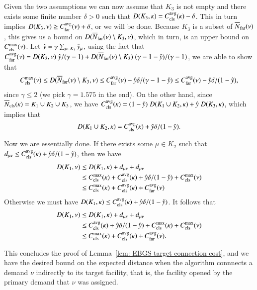 \documentclass[preprint,12pt]{elsarticle}
\begin{document}
  Given the two assumptions we can now assume that $K_3$ is not empty
  and there exists some finite number $\delta > 0$ such that $D(K_3,
  \kappa) = \clsdist(\kappa) - \delta$. This in turn implies $D(K_3,
  \nu) \geq \fardist(\nu) + \delta$, or we will be done. Because $K_3$
  is a subset of $\wbarfarnb(\nu)$, this gives us a bound on
  $D(\wbarfarnb(\nu) \setminus K_3, \nu)$, which in turn, is an upper
  bound on $\clsmax(\nu)$. Let $\hat{y} = \gamma \sum_{\mu\in K_3}
  \bary_{\mu}$, using the fact that $\fardist(\nu) = D(K_3,\nu)\;
  \hat{y}/(\gamma-1) + D(\wbarfarnb(\nu)\setminus K_3)\;
  (\gamma-1-\hat{y})/(\gamma-1)$, we are able to show that
  \begin{equation*}
    \clsmax(\nu) \leq D(\wbarfarnb(\nu) \setminus K_3, \nu) \leq \fardist(\nu) -
    \hat{y}\delta/(\gamma-1-\hat{y}) \leq \fardist(\nu) -
    \hat{y}\delta/(1-\hat{y}),
  \end{equation*}
  since $\gamma \leq 2$ (we pick $\gamma=1.575$ in the end). On the
  other hand, since $\wbarclsnb(\kappa) = K_1 \cup K_2 \cup K_3$, we
  have $\clsdist(\kappa) = (1-\hat{y})\; D(K_1\cup K_2, \kappa) +
  \hat{y}\; D(K_3, \kappa)$, which implies that
  \begin{equation*}
    D(K_1 \cup K_2, \kappa) = \clsdist(\kappa) + \hat{y}\delta/(1-\hat{y}).
  \end{equation*}

  Now we are essentially done. If there exists some $\mu \in K_2$ such
  that $d_{\mu\kappa} \leq \clsdist(\kappa) +
  \hat{y}\delta/(1-\hat{y})$, then we have
  \begin{align*}
    D(K_1, \nu) &\leq D(K_1, \kappa) + d_{\mu\kappa} + d_{\mu\nu} \\
    &\leq \clsmax(\kappa) + \clsdist(\kappa) +
    \hat{y}\delta/(1-\hat{y})
    + \clsmax(\nu)\\
    &\leq \clsmax(\kappa) + \clsdist(\kappa) + \fardist(\nu)
  \end{align*}
  Otherwise we must have $D(K_1, \kappa) \leq \clsdist(\kappa) +
  \hat{y}\delta/(1-\hat{y})$. It follows that
  \begin{align*}
    D(K_1, \nu) &\leq D(K_1, \kappa) + d_{\mu\kappa} + d_{\mu\nu} \\
    &\leq \clsdist(\kappa) + \hat{y}\delta/(1-\hat{y}) +
    \clsmax(\kappa)
    + \clsmax(\nu)\\
    &\leq \clsmax(\kappa) + \clsdist(\kappa) + \fardist(\nu).
  \end{align*}

  This concludes the proof of Lemma~\ref{lem: EBGS target connection
    cost}, and we have the desired bound on the expected distance when
  the algorithm connnects a demand $\nu$ indirectly to its target
  facility, that is, the facility opened by the primary demand that
  $\nu$ was assigned.
\end{document}
